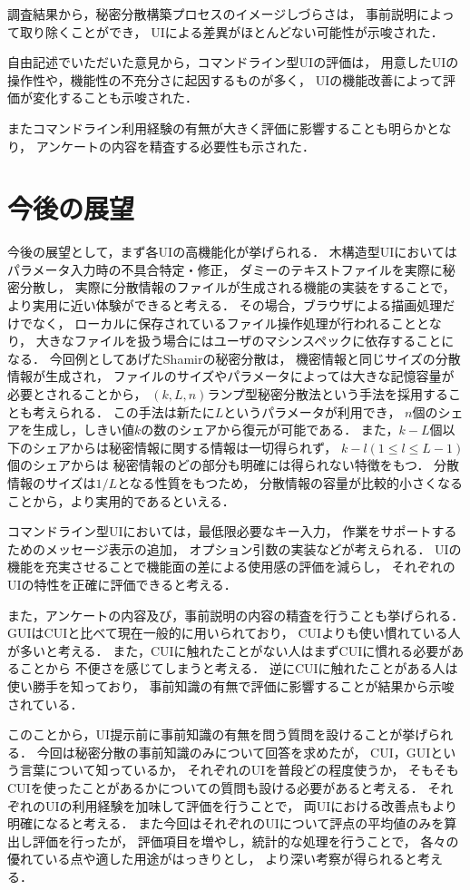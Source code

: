 \documentclass[twocolumn, fleqn, uplatex]{jsarticle}
\begin{document}
調査結果から，秘密分散構築プロセスのイメージしづらさは，%
事前説明によって取り除くことができ，%
UIによる差異がほとんどない可能性が示唆された．

自由記述でいただいた意見から，コマンドライン型UIの評価は，%
用意したUIの操作性や，機能性の不充分さに起因するものが多く，%
UIの機能改善によって評価が変化することも示唆された．

またコマンドライン利用経験の有無が大きく評価に影響することも明らかとなり，%
アンケートの内容を精査する必要性も示された．

\section{今後の展望}
今後の展望として，まず各UIの高機能化が挙げられる．%
木構造型UIにおいてはパラメータ入力時の不具合特定・修正，%
ダミーのテキストファイルを実際に秘密分散し，%
実際に分散情報のファイルが生成される機能の実装をすることで，%
より実用に近い体験ができると考える．%
その場合，ブラウザによる描画処理だけでなく，%
ローカルに保存されているファイル操作処理が行われることとなり，%
大きなファイルを扱う場合にはユーザのマシンスペックに依存することになる．%
今回例としてあげたShamirの秘密分散は，%
機密情報と同じサイズの分散情報が生成され，%
ファイルのサイズやパラメータによっては大きな記憶容量が必要とされることから，%
$(k, L, n)$ランプ型秘密分散法という手法を採用することも考えられる．%
この手法は新たに$L$というパラメータが利用でき，%
$n$個のシェアを生成し，しきい値$k$の数のシェアから復元が可能である．%
また，$k - L$個以下のシェアからは秘密情報に関する情報は一切得られず，%
$k - l(1{\leq}l{\leq}L-1)$個のシェアからは%
秘密情報のどの部分も明確には得られない特徴をもつ．%
分散情報のサイズは$1/L$となる性質をもつため，%
分散情報の容量が比較的小さくなることから，より実用的であるといえる．%

コマンドライン型UIにおいては，最低限必要なキー入力，%
作業をサポートするためのメッセージ表示の追加，%
オプション引数の実装などが考えられる．%
UIの機能を充実させることで機能面の差による使用感の評価を減らし，%
それぞれのUIの特性を正確に評価できると考える．

また，アンケートの内容及び，事前説明の内容の精査を行うことも挙げられる．%
GUIはCUIと比べて現在一般的に用いられており，%
CUIよりも使い慣れている人が多いと考える．%
また，CUIに触れたことがない人はまずCUIに慣れる必要があることから%
不便さを感じてしまうと考える．%
逆にCUIに触れたことがある人は使い勝手を知っており，%
事前知識の有無で評価に影響することが結果から示唆されている．

このことから，UI提示前に事前知識の有無を問う質問を設けることが挙げられる．%
今回は秘密分散の事前知識のみについて回答を求めたが，%
CUI，GUIという言葉について知っているか，%
それぞれのUIを普段どの程度使うか，%
そもそもCUIを使ったことがあるかについての質問も設ける必要があると考える．%
それぞれのUIの利用経験を加味して評価を行うことで，%
両UIにおける改善点もより明確になると考える．%
また今回はそれぞれのUIについて評点の平均値のみを算出し評価を行ったが，%
評価項目を増やし，統計的な処理を行うことで，%
各々の優れている点や適した用途がはっきりとし，%
より深い考察が得られると考える．
\end{document}
